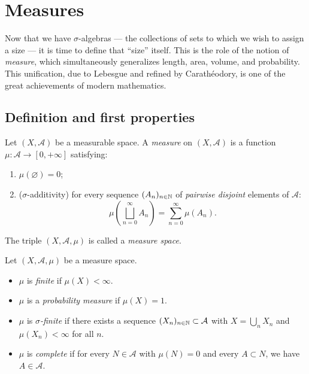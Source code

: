 \chapter{Measures}
\label{ch:measures}

Now that we have $\sigma$-algebras --- the collections of sets to which we
wish to assign a size --- it is time to define that ``size'' itself. This is
the role of the notion of \emph{measure}, which simultaneously generalizes
length, area, volume, and probability. This unification, due to Lebesgue and
refined by Carath\'eodory, is one of the great achievements of modern
mathematics.

\section{Definition and first properties}

\begin{definition}[Measure]
Let $(X, \mathcal{A})$ be a measurable space. A \emph{measure} on
$(X, \mathcal{A})$ is a function $\mu : \mathcal{A} \to [0, +\infty]$ satisfying:
\begin{enumerate}
    \item[(i)] $\mu(\varnothing) = 0$;
    \item[(ii)] ($\sigma$-additivity) for every sequence $(A_n)_{n \in \mathbb{N}}$ of
    \emph{pairwise disjoint} elements of $\mathcal{A}$:
    \[
    \mu\!\left(\bigsqcup_{n=0}^{\infty} A_n\right) = \sum_{n=0}^{\infty} \mu(A_n).
    \]
\end{enumerate}
The triple $(X, \mathcal{A}, \mu)$ is called a \emph{measure space}.
\end{definition}

\begin{definition}
Let $(X, \mathcal{A}, \mu)$ be a measure space.
\begin{itemize}
    \item $\mu$ is \emph{finite} if $\mu(X) < \infty$.
    \item $\mu$ is a \emph{probability measure} if $\mu(X) = 1$.
    \item $\mu$ is \emph{$\sigma$-finite} if there exists a sequence
    $(X_n)_{n \in \mathbb{N}} \subset \mathcal{A}$ with $X = \bigcup_n X_n$ and
    $\mu(X_n) < \infty$ for all $n$.
    \item $\mu$ is \emph{complete} if for every $N \in \mathcal{A}$ with
    $\mu(N) = 0$ and every $A \subset N$, we have $A \in \mathcal{A}$.
\end{itemize}
\end{definition}

